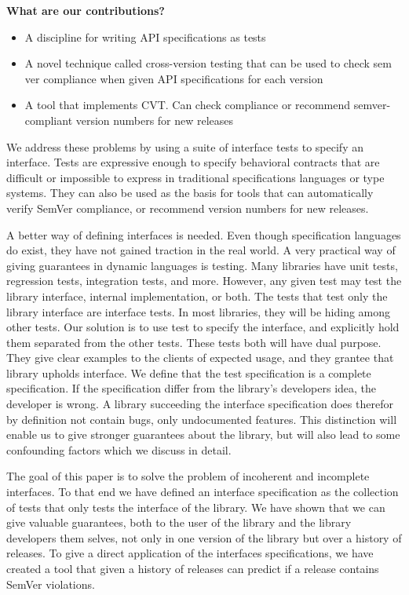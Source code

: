 {\bf What are our contributions?}
\begin{itemize}
\item A discipline for writing API specifications as tests
\item A novel technique called cross-version testing that can be used
  to check sem ver compliance when given API specifications for each
  version
\item A tool that implements CVT. Can check compliance or recommend
  semver-compliant version numbers for new releases
\end{itemize}

We address these problems by using a suite of interface tests to
specify an interface. Tests are expressive enough to specify
behavioral contracts that are difficult or impossible to express in
traditional specifications languages or type systems. They can also be
used as the basis for tools that can automatically verify SemVer
compliance, or recommend version numbers for new releases.

A better way of defining interfaces is needed. Even though specification
languages do exist, they have not gained traction in the real world. A very
practical way of giving guarantees in dynamic languages is testing.  Many
libraries have unit tests, regression tests, integration tests, and more.
However, any given test may test the library interface, internal
implementation, or both.  The tests that test only the library interface are
interface tests. In most libraries, they will be hiding among other tests.  Our
solution is to use test to specify the interface, and explicitly hold them
separated from the other tests. These tests both will have dual purpose. They
give clear examples to the clients of expected usage, and they grantee that
library upholds interface. We define that the test specification is a complete
specification. If the specification differ from the library's developers idea,
the developer is wrong.  A library succeeding the interface specification does
therefor by definition not contain bugs, only undocumented features. This
distinction will enable us to give stronger guarantees about the library, but
will also lead to some confounding factors which we discuss in detail.

The goal of this paper is to solve the problem of incoherent and
incomplete interfaces. To that end we have defined an interface specification
as the collection of tests that only tests the interface of the library. We have
shown that we can give valuable guarantees, both to the user of the library and
the library developers them selves, not only in one version of the library but 
over a history of releases. To give a direct application of the interfaces 
specifications, we have created a tool that given a history of releases can
predict if a release contains SemVer violations. 


